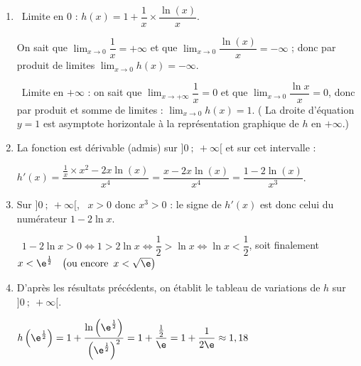 \begin{enumerate}
\item %
\starredbullet~Limite en $0$ : $h(x) = 1 + \dfrac{1}{x} \times \dfrac{\ln (x)}{x}$.

On sait que $\displaystyle\lim_{x \to 0} \dfrac{1}{x} = + \infty$ et que $\displaystyle\lim_{x \to 0} \dfrac{\ln (x)}{x} = - \infty$ ; donc par produit de limites $\displaystyle\lim_{x \to 0} h(x) = - \infty$.

\starredbullet~Limite en $+ \infty$ : on sait que $\displaystyle\lim_{x \to + \infty} \dfrac{1}{x} = 0$ et que $\displaystyle\lim_{x \to 0} \dfrac{\ln x}{x} = 0$, donc par produit et somme de limites : $\displaystyle\lim_{x \to 0} h(x) = 1$. ( La droite d'équation $y = 1$ est asymptote horizontale à la représentation graphique de $h$ en $+\infty$.)
  
\item %
La fonction est dérivable (admis) sur $]0~;~ +\infty[$ et sur cet intervalle :

$h'(x) = \dfrac{\frac{1}{x} \times x^2 - 2x\ln (x)}{x^4} = \dfrac{x - 2x\ln (x)}{x^4}  = \dfrac{1 - 2\ln (x)}{x^3}$.
\item %
Sur $]0~;~ +\infty[$, \, $x > 0$ donc $x^3 > 0$ : le signe de $h'(x)$ est donc celui du numérateur $1 - 2\ln x$.

\starredbullet~$1 - 2\ln x > 0 \iff 1 > 2\ln x \iff \dfrac{1}{2} > \ln x \iff  \ln x < \dfrac{1}{2}$, soit finalement $x < \e^{\frac{1}{2}}$ \, $\left(\text{ou encore }\, x < \sqrt{\e} \right)$

\item %
D'après les résultats précédents, on établit le tableau de variations de $h$ sur $]0~;~+\infty[$.

$h\left ( \e^{\frac{1}{2}}\right ) = 1+\dfrac{\ln\left (\e^{\frac{1}{2}}\right )}{\left (\e^{\frac{1}{2}}\right )^2}= 1+\dfrac{\frac{1}{2}}{\e}= 1+\dfrac{1}{2\e}\approx 1,18$


\end{enumerate}
